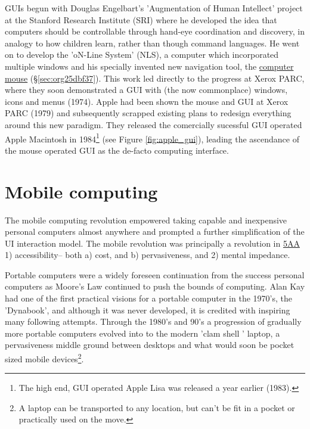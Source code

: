 \documentclass[logo,bsc,singlespacing,parskip]{infthesis}
\begin{document}
GUIs begun with Douglas Engelbart's 'Augmentation of Human Intellect' project at the Stanford Research Institute (SRI) where he developed the idea that computers should be controllable through hand-eye coordination and discovery, in analogy to how children learn, rather than though command languages.
He went on to develop the 'oN-Line System' (NLS), a computer which incorporated multiple windows and his specially invented new navigation tool, the \hyperref[sec:org25dbf37]{computer mouse} (\S \ref{sec:org25dbf37}).
This work led directly to the progress at Xerox PARC, where they soon demonstrated a GUI with (the now commonplace) windows, icons and menus (1974).
Apple had been shown the mouse and GUI at Xerox PARC (1979) and subsequently scrapped existing plans to redesign everything around this new paradigm.
They released the comercially sucessful GUI operated Apple Macintosh in 1984\footnote{The high end, GUI operated Apple Lisa was released a year earlier (1983).} (see Figure \ref{fig:apple_gui}),  leading the ascendance of the mouse operated GUI as the de-facto computing interface.

\section{Mobile computing}
\label{sec:orgda608db}
The mobile computing revolution empowered taking capable and inexpensive personal computers almost anywhere and prompted a further simplification of the UI interaction model.
The mobile revolution was principally a revolution in \hyperref[orgce96c46]{5AA} 1) accessibility-- both a) cost, and b) pervasiveness, and 2) mental impedance.

Portable computers were a widely foreseen continuation from the success personal computers as Moore's Law continued to push the bounds of computing.
Alan Kay had one of the first practical visions for a portable computer in the 1970's, the 'Dynabook', and although it was never developed, it is credited with inspiring many following attempts.
Through the 1980's and 90's a progression of gradually more portable computers evolved into to the modern 'clam shell ' laptop, a pervasiveness middle ground between desktops and what would soon be pocket sized mobile devices\footnote{A laptop can be transported to any location, but can't be fit in a pocket or practically used on the move.}.
\end{document}
